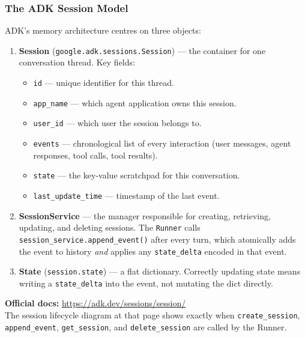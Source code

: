 \documentclass[12pt, a4paper]{article}
\begin{document}
\begin{theorybox}
\subsubsection*{The ADK Session Model}

ADK's memory architecture centres on three objects:

\begin{enumerate}[leftmargin=*, itemsep=3pt]
  \item \textbf{Session} (\texttt{google.adk.sessions.Session}) --- the container for
    one conversation thread. Key fields:
    \begin{itemize}[itemsep=1pt]
      \item \texttt{id} --- unique identifier for this thread.
      \item \texttt{app\_name} --- which agent application owns this session.
      \item \texttt{user\_id} --- which user the session belongs to.
      \item \texttt{events} --- chronological list of every interaction (user messages,
        agent responses, tool calls, tool results).
      \item \texttt{state} --- the key-value scratchpad for this conversation.
      \item \texttt{last\_update\_time} --- timestamp of the last event.
    \end{itemize}

  \item \textbf{SessionService} --- the manager responsible for creating, retrieving,
    updating, and deleting sessions. The \texttt{Runner} calls
    \texttt{session\_service.append\_event()} after every turn, which atomically adds
    the event to history \emph{and} applies any \texttt{state\_delta} encoded in that
    event.

  \item \textbf{State} (\texttt{session.state}) --- a flat dictionary. Correctly
    updating state means writing a \texttt{state\_delta} into the event, not mutating
    the dict directly.
\end{enumerate}

\begin{notebox}
\textbf{Official docs:} \url{https://adk.dev/sessions/session/}\\
The session lifecycle diagram at that page shows exactly when
\texttt{create\_session}, \texttt{append\_event}, \texttt{get\_session}, and
\texttt{delete\_session} are called by the Runner.
\end{notebox}


\end{theorybox}
\end{document}
